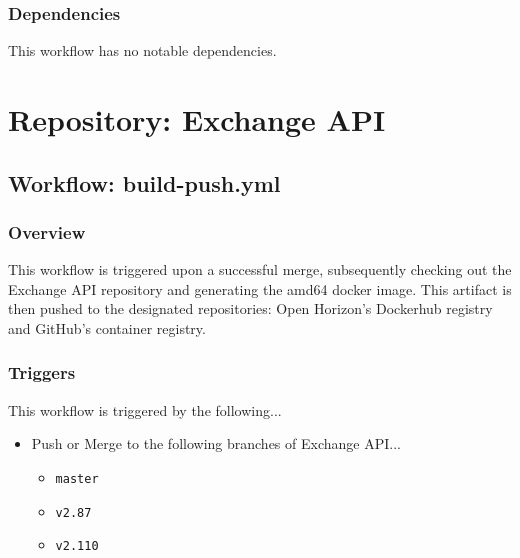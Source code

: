 \documentclass[a4paper,11pt]{article}
\begin{document}
\subsubsection{Dependencies}
This workflow has no notable dependencies.





\newpage
\section{Repository: Exchange API}

\subsection{Workflow: build-push.yml}

\subsubsection{Overview}
This workflow is triggered upon a successful merge, subsequently checking out the Exchange API repository and generating the amd64 docker image. This artifact is then pushed to the designated repositories: Open Horizon's Dockerhub registry and GitHub's container registry. 

\subsubsection{Triggers}
This workflow is triggered by the following...
\begin{itemize}
    \item Push or Merge to the following branches of Exchange API...
    \begin{itemize}
        \item\verb|master|
        \item\verb|v2.87|
        \item\verb|v2.110|
    \end{itemize}
\end{itemize}
\end{document}

